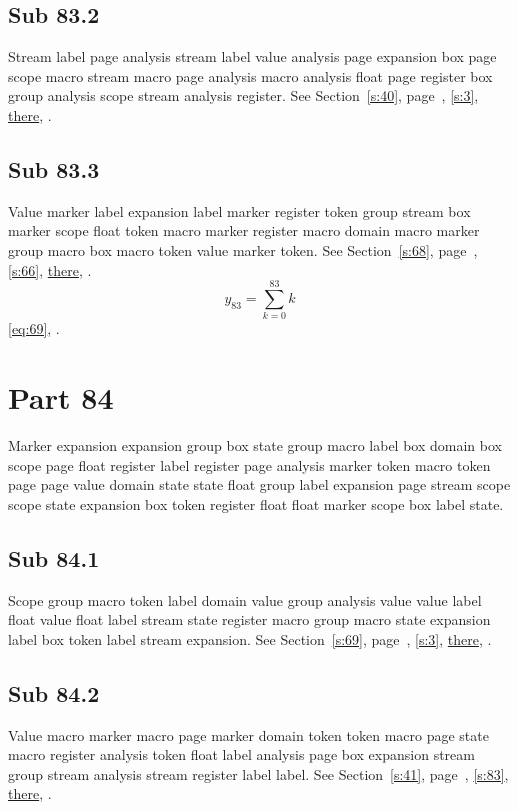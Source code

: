 \documentclass[11pt]{article}
\begin{document}
\subsection{Sub 83.2}\label{ss:83.2} Stream label page analysis stream label value analysis page expansion box page scope macro stream macro page analysis macro analysis float page register box group analysis scope stream analysis register. See Section~\ref{s:40}, page~\pageref{ss:96.3}, \cref{s:3}, \hyperref[s:59]{there}, \cite{k98,k62}.
\subsection{Sub 83.3}\label{ss:83.3} Value marker label expansion label marker register token group stream box marker scope float token macro marker register macro domain macro marker group macro box macro token value marker token. See Section~\ref{s:68}, page~\pageref{ss:17.1}, \cref{s:66}, \hyperref[s:85]{there}, \cite{k96,k105}.
\begin{equation}y_{83}=\sum_{k=0}^{83}k\label{eq:83}\end{equation} \eqref{eq:69}, .
\section{Part 84}\label{s:84}
Marker expansion expansion group box state group macro label box domain box scope page float register label register page analysis marker token macro token page page value domain state state float group label expansion page stream scope scope state expansion box token register float float marker scope box label state.
\subsection{Sub 84.1}\label{ss:84.1} Scope group macro token label domain value group analysis value value label float value float label stream state register macro group macro state expansion label box token label stream expansion. See Section~\ref{s:69}, page~\pageref{ss:92.1}, \cref{s:3}, \hyperref[s:38]{there}, \cite{k96,k97}.
\subsection{Sub 84.2}\label{ss:84.2} Value macro marker macro page marker domain token token macro page state macro register analysis token float label analysis page box expansion stream group stream analysis stream register label label. See Section~\ref{s:41}, page~\pageref{ss:50.3}, \cref{s:83}, \hyperref[s:95]{there}, \cite{k106,k113}.
\end{document}
